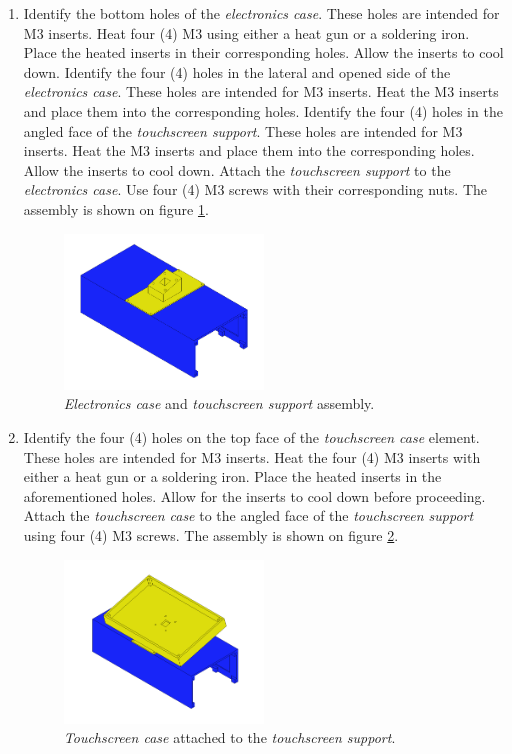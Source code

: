 \documentclass{article}
\begin{document}
\begin{enumerate}
    \item Identify the bottom holes of the \textit{electronics case}. These holes are intended for M3 inserts. Heat four (4) M3 using either a heat gun or a soldering iron. Place the heated inserts in their corresponding holes. Allow the inserts to cool down. Identify the four (4) holes in the lateral and opened side of the \textit{electronics case}. These holes are intended for M3 inserts. Heat the M3 inserts and place them into the corresponding holes. Identify the four (4) holes in the angled face of the \textit{touchscreen support}. These holes are intended for M3 inserts. Heat the M3 inserts and place them into the corresponding holes. Allow the inserts to cool down. Attach the \textit{touchscreen support} to the \textit{electronics case}. Use four (4) M3 screws with their corresponding nuts. The assembly is shown on figure \ref{fig:electronics_5}.
    
    \begin{figure}[H]
        \centering
        \includegraphics[width=0.5\textwidth]{images/electronics/step_E.png}
        \caption{\textit{Electronics case} and \textit{touchscreen support} assembly.}
        \label{fig:electronics_5}
    \end{figure}
    
    \item Identify the four (4) holes on the top face of the \textit{touchscreen case} element. These holes are intended for M3 inserts. Heat the four (4) M3 inserts with either a heat gun or a soldering iron. Place the heated inserts in the aforementioned holes. Allow for the inserts to cool down before proceeding. Attach the \textit{touchscreen case} to the angled face of the \textit{touchscreen support} using four (4) M3 screws. The assembly is shown on figure \ref{fig:electronics_6}.
    
    \begin{figure}[H]
        \centering
        \includegraphics[width=0.5\textwidth]{images/electronics/step_F.png}
        \caption{\textit{Touchscreen case} attached to the \textit{touchscreen support}.}
        \label{fig:electronics_6}
    \end{figure}
    

\end{enumerate}
\end{document}
